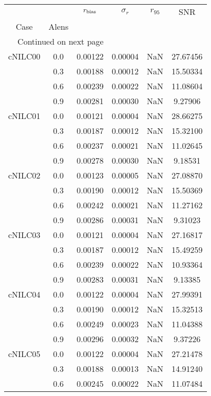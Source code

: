 \begin{longtable}{cccccc}
\toprule
        &     &  $r_{\rm bias}$  &  $\sigma_r$ &  $r_{95}$ &      SNR \\
Case & Alens &                  &             &           &          \\
\midrule
\endhead
\midrule
\multicolumn{3}{r}{{Continued on next page}} \\
\midrule
\endfoot

\bottomrule
\endlastfoot
cNILC00 & 0.0 & 0.00122 & 0.00004 & NaN & 27.67456 \\
        & 0.3 & 0.00188 & 0.00012 & NaN & 15.50334 \\
        & 0.6 & 0.00239 & 0.00022 & NaN & 11.08604 \\
        & 0.9 & 0.00281 & 0.00030 & NaN & 9.27906 \\
cNILC01 & 0.0 & 0.00121 & 0.00004 & NaN & 28.66275 \\
        & 0.3 & 0.00187 & 0.00012 & NaN & 15.32100 \\
        & 0.6 & 0.00237 & 0.00021 & NaN & 11.02645 \\
        & 0.9 & 0.00278 & 0.00030 & NaN & 9.18531 \\
cNILC02 & 0.0 & 0.00123 & 0.00005 & NaN & 27.08870 \\
        & 0.3 & 0.00190 & 0.00012 & NaN & 15.50369 \\
        & 0.6 & 0.00242 & 0.00021 & NaN & 11.27162 \\
        & 0.9 & 0.00286 & 0.00031 & NaN & 9.31023 \\
cNILC03 & 0.0 & 0.00121 & 0.00004 & NaN & 27.16817 \\
        & 0.3 & 0.00187 & 0.00012 & NaN & 15.49259 \\
        & 0.6 & 0.00239 & 0.00022 & NaN & 10.93364 \\
        & 0.9 & 0.00283 & 0.00031 & NaN & 9.13385 \\
cNILC04 & 0.0 & 0.00122 & 0.00004 & NaN & 27.99391 \\
        & 0.3 & 0.00190 & 0.00012 & NaN & 15.32513 \\
        & 0.6 & 0.00249 & 0.00023 & NaN & 11.04388 \\
        & 0.9 & 0.00296 & 0.00032 & NaN & 9.37226 \\
cNILC05 & 0.0 & 0.00122 & 0.00004 & NaN & 27.21478 \\
        & 0.3 & 0.00188 & 0.00013 & NaN & 14.91240 \\
        & 0.6 & 0.00245 & 0.00022 & NaN & 11.07484 \\

\end{longtable}
